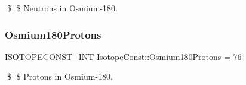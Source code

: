 \$ \$ Neutrons in Osmium-\/180. \mbox{\label{group___isotope_const-_osmium-_os180_ga88124bd0679083cbf4f8058367e43d2d}} 
\subsubsection{\texorpdfstring{Osmium180\+Protons}{Osmium180Protons}}
{\footnotesize\ttfamily \mbox{\hyperlink{group___isotope_const-_macros_ga5f18360b3e99483a35c32d789e62621c}{I\+S\+O\+T\+O\+P\+E\+C\+O\+N\+S\+T\+\_\+\+I\+NT}} Isotope\+Const\+::\+Osmium180\+Protons = 76}

\$ \$ Protons in Osmium-\/180. 